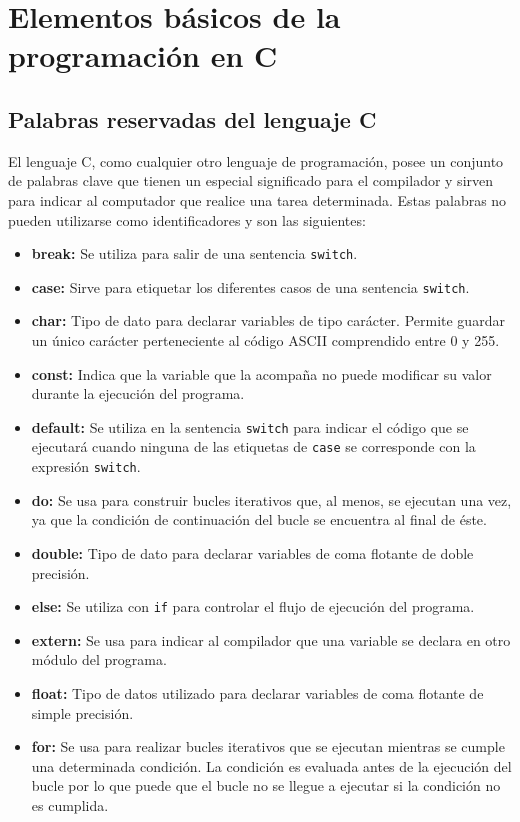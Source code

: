 \chapter{Elementos básicos de la programación en C}
\section{Palabras reservadas del lenguaje C}
El lenguaje C, como cualquier otro lenguaje de programación, posee un conjunto de palabras clave que tienen un especial significado para el compilador y sirven para indicar al computador que realice una tarea determinada. Estas palabras no pueden utilizarse como identificadores y son las siguientes:
\begin{itemize}
	\item \textbf{break:} Se utiliza para salir de una sentencia \texttt{switch}.
	\item \textbf{case:} Sirve para etiquetar los diferentes casos de una sentencia \texttt{switch}.
	\item \textbf{char:} Tipo de dato para declarar variables de tipo carácter. Permite guardar un único carácter perteneciente al código ASCII comprendido entre 0 y 255.
	\item \textbf{const:} Indica que la variable que la acompaña no puede modificar su valor durante la ejecución del programa.
	\item \textbf{default:} Se utiliza en la sentencia \texttt{switch} para indicar el código que se ejecutará cuando ninguna de las etiquetas de \texttt{case} se corresponde con la expresión \texttt{switch}.
	\item \textbf{do:} Se usa para construir bucles iterativos que, al menos, se ejecutan una vez, ya que la condición de continuación del bucle se encuentra al final de éste.
	\item \textbf{double:} Tipo de dato para declarar variables de coma flotante de doble precisión.
	\item \textbf{else:} Se utiliza con \texttt{if} para controlar el flujo de ejecución del programa.
	\item \textbf{extern:} Se usa para indicar al compilador que una variable se declara en otro módulo del programa.
	\item \textbf{float:} Tipo de datos utilizado para declarar variables de coma flotante de simple precisión.
	\item \textbf{for:} Se usa para realizar bucles iterativos que se ejecutan mientras se cumple una determinada condición. La condición es evaluada antes de la ejecución del bucle por lo que puede que el bucle no se llegue a ejecutar si la condición no es cumplida.

\end{itemize}
